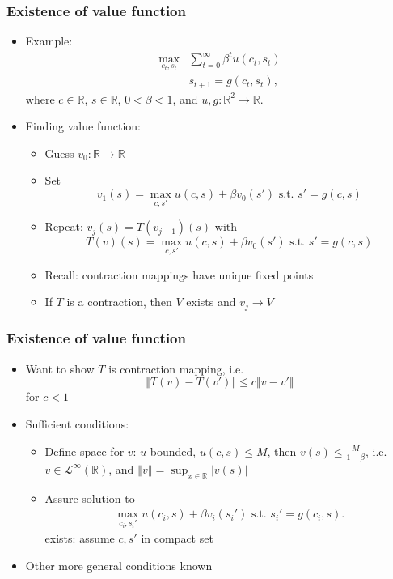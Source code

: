 \documentclass[compress]{beamer}
\def\R{\mathbb{R}}
\newcommand{\norm}[1]{\left\Vert {#1} \right\Vert}
\newcommand{\abs}[1]{\left\vert {#1} \right\vert}
\renewcommand{\to}{{\rightarrow}}
\begin{document}
\begin{frame}\frametitle{Existence of value function}
  \begin{itemize}
  \item Example:
    \begin{align*}
      \max_{c_t,s_t} & \sum_{t=0}^\infty \beta^t u(c_t,s_t) \\
      & s_{t+1} = g(c_t,s_t),
    \end{align*}
    where $c \in \R$, $s \in \R$, $0<\beta<1$, and $u,g:\R^2 \to \R$.
  \item Finding value function:
    \begin{itemize}
    \item Guess $v_0: \R\to \R$
    \item Set 
      \[ v_1(s) = \max_{c,s'} u(c,s) + \beta v_0(s') \text{ s.t. }
      s'=g(c,s) \]
    \item Repeat: $v_j(s) = T(v_{j-1})(s)$ with 
      \[ T(v)(s) = \max_{c,s'} u(c,s) + \beta v_0(s') \text{ s.t. }
      s'=g(c,s) \]
    \item Recall: contraction mappings  have unique fixed points 
    \item If $T$ is a contraction, then $V$ exists and $v_j \to V$
    \end{itemize} 
  \end{itemize}
\end{frame}

\begin{frame}
  \frametitle{Existence of value function}
  \begin{itemize}
  \item Want to show $T$ is contraction mapping, i.e.\
    \[ \norm{T(v) - T(v')} \leq c \norm{v-v'} \]
    for $c < 1$
  \item Sufficient conditions:
    \begin{itemize}
    \item Define space for $v$: $u$ bounded, $u(c,s) \leq M$, then
      $v(s) \leq \frac{M}{1-\beta}$, i.e. $v \in
      \mathcal{L}^\infty(\R)$, and $\norm{v} = \sup_{x \in \R}
      \abs{v(s)}$
    \item Assure solution to 
      \begin{align*}
        \max_{c_i,s_i'} u(c_i,s) + \beta v_i(s_i') \text{ s.t. }
        s_i'=g(c_i,s).
      \end{align*}
      exists: assume $c,s'$ in compact set
    \end{itemize}
  \item Other more general conditions known
  \end{itemize}
\end{frame}
\end{document}
